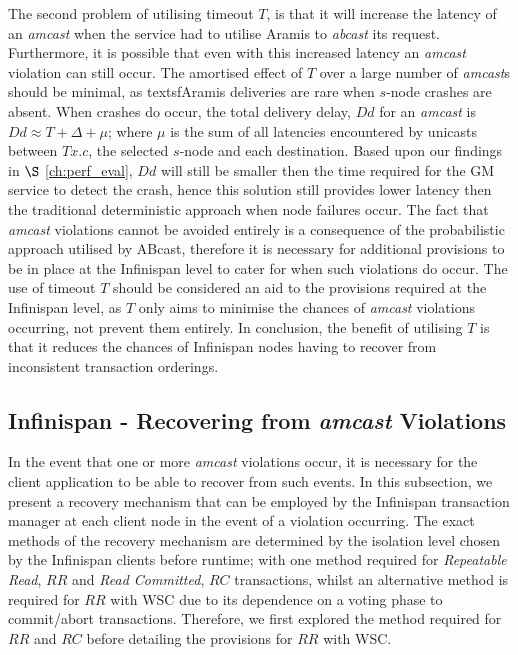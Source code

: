     The second problem of utilising timeout $T$, is that it will increase the latency of an \emph{amcast} when the service had to utilise \textsf{Aramis} to \emph{abcast} its request.  Furthermore, it is possible that even with this increased latency an \emph{amcast} violation can still occur.  The amortised effect of $T$ over a large number of \emph{amcast}s should be minimal, as textsf{Aramis} deliveries are rare when $s$-node crashes are absent.  When crashes do occur, the total delivery delay, $Dd$ for an \emph{amcast} is $Dd \approx T + \Delta + \mu$; where $\mu$ is the sum of all latencies encountered by unicasts between $Tx.c$, the selected $s$-node and each destination.  Based upon our findings in $\S$ \ref{ch:perf_eval}, $Dd$ will still be smaller then the time required for the GM service to detect the crash, hence this solution still provides lower latency then the traditional deterministic approach when node failures occur.  The fact that \emph{amcast} violations cannot be avoided entirely is a consequence of the probabilistic approach utilised by \textsf{ABcast}, therefore it is necessary for additional provisions to be in place at the Infinispan level to cater for when such violations do occur.  The use of timeout $T$ should be considered an aid to the provisions required at the Infinispan level, as $T$ only aims to minimise the chances of \emph{amcast} violations occurring, not prevent them entirely.  In conclusion, the benefit of utilising $T$ is that it reduces the chances of Infinispan nodes having to recover from inconsistent transaction orderings.  
    
    \subsection{Infinispan - Recovering from \emph{amcast} Violations}
    In the event that one or more \emph{amcast} violations occur, it is necessary for the client application to be able to recover from such events.  In this subsection, we present a recovery mechanism that can be employed by the Infinispan transaction manager at each client node in the event of a violation occurring.  The exact methods of the recovery mechanism are determined by the isolation level chosen by the Infinispan clients before runtime; with one method required for \emph{Repeatable Read}, $RR$ and \emph{Read Committed}, $RC$ transactions, whilst an alternative method is required for $RR$ with WSC due to its dependence on a voting phase to commit/abort transactions.  Therefore, we first explored the method required for $RR$ and $RC$ before detailing the provisions for $RR$ with WSC.  
    
